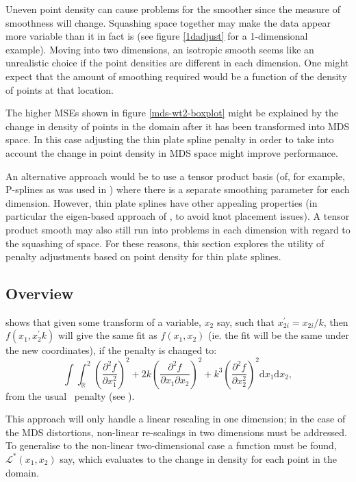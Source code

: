 Uneven point density can cause problems for the smoother since the measure of smoothness will change.  Squashing space together may make the data appear more variable than it in fact is (see figure \ref{1dadjust} for a 1-dimensional example). Moving into two dimensions, an isotropic smooth seems like an unrealistic choice if the point densities are different in each dimension. One might expect that the amount of smoothing required would be a function of the density of points at that location.

The higher MSEs shown in figure \ref{mds-wt2-boxplot} might be explained by the change in density of points in the domain after it has been transformed into MDS space. In this case adjusting the thin plate spline penalty in order to take into account the change in point density in MDS space might improve performance.

An alternative approach would be to use a tensor product basis (of, for example, P-splines as was used in ) where there is a separate smoothing parameter for each dimension. However, thin plate splines have other appealing properties (in particular the eigen-based approach of \cite{wood2003}, to avoid knot placement issues). A tensor product smooth may also still run into problems in each dimension with regard to the squashing of space. For these reasons, this section explores the utility of penalty adjustments based on point density for thin plate splines.

\subsection{Overview}

 shows that given some transform of a variable, $x_2$ say, such that $x_{2i}^\prime=x_{2i}/k$, then $f(x_1,x_2^\prime k)$ will give the same fit as $f(x_1,x_2)$ (ie. the fit will be the same under the new coordinates), if the penalty is changed to:
\begin{equation}
\int\int_\mathbb{R}^2 \left ( \frac{\partial^2 f}{\partial x_1^2} \right )^2 + 2k\left ( \frac{\partial^2 f}{\partial x_1 \partial x_2} \right )^2 + k^3\left ( \frac{\partial^2 f}{\partial x_2^2} \right )^2 \text{d}x_1 \text{d}x_2,
\label{adjustedintegral}
\end{equation}
from the usual \tprs\ penalty (see ).

This approach will only handle a linear rescaling in one dimension; in the case of the MDS distortions, non-linear re-scalings in two dimensions must be addressed. To generalise  to the non-linear two-dimensional case a function must be found, $\mathcal{L}^*(x_1,x_2)$ say, which evaluates to the change in density for each point in the domain. 

